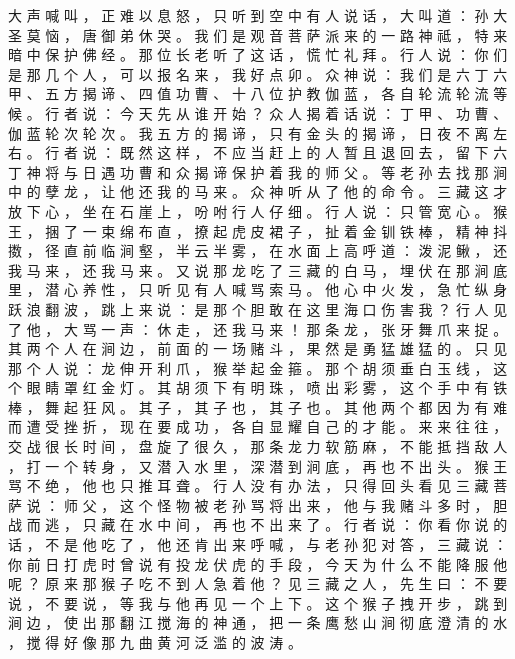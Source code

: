 {大 声 喊 叫 ， 正 难 以 息 怒 ， 只 听 到 空 中 有 人 说 话 ， 大 叫 道 ： 孙 大 圣 莫 恼 ， 唐 御 弟 休 哭 。
我 们 是 观 音 菩 萨 派 来 的 一 路 神 祗 ， 特 来 暗 中 保 护 佛 经 。
那 位 长 老 听 了 这 话 ， 慌 忙 礼 拜 。
行 人 说 ： 你 们 是 那 几 个 人 ， 可 以 报 名 来 ， 我 好 点 卯 。
众 神 说 ： 我 们 是 六 丁 六 甲 、 五 方 揭 谛 、 四 值 功 曹 、 十 八 位 护 教 伽 蓝 ， 各 自 轮 流 轮 流 等 候 。
行 者 说 ： 今 天 先 从 谁 开 始 ？ 众 人 揭 着 话 说 ： 丁 甲 、 功 曹 、 伽 蓝 轮 次 轮 次 。
我 五 方 的 揭 谛 ， 只 有 金 头 的 揭 谛 ， 日 夜 不 离 左 右 。
行 者 说 ： 既 然 这 样 ， 不 应 当 赶 上 的 人 暂 且 退 回 去 ， 留 下 六 丁 神 将 与 日 遇 功 曹 和 众 揭 谛 保 护 着 我 的 师 父 。
等 老 孙 去 找 那 涧 中 的 孽 龙 ， 让 他 还 我 的 马 来 。
众 神 听 从 了 他 的 命 令 。
三 藏 这 才 放 下 心 ， 坐 在 石 崖 上 ， 吩 咐 行 人 仔 细 。
行 人 说 ： 只 管 宽 心 。
猴 王 ， 捆 了 一 束 绵 布 直 ， 撩 起 虎 皮 裙 子 ， 扯 着 金 钏 铁 棒 ， 精 神 抖 擞 ， 径 直 前 临 涧 壑 ， 半 云 半 雾 ， 在 水 面 上 高 呼 道 ： 泼 泥 鳅 ， 还 我 马 来 ， 还 我 马 来 。 又 说 那 龙 吃 了 三 藏 的 白 马 ， 埋 伏 在 那 涧 底 里 ， 潜 心 养 性 ， 只 听 见 有 人 喊 骂 索 马 。
他 心 中 火 发 ， 急 忙 纵 身 跃 浪 翻 波 ， 跳 上 来 说 ： 是 那 个 胆 敢 在 这 里 海 口 伤 害 我 ？ 行 人 见 了 他 ， 大 骂 一 声 ： 休 走 ， 还 我 马 来 ！
那 条 龙 ， 张 牙 舞 爪 来 捉 。
其 两 个 人 在 涧 边 ， 前 面 的 一 场 赌 斗 ， 果 然 是 勇 猛 雄 猛 的 。
只 见 那 个 人 说 ： 龙 伸 开 利 爪 ， 猴 举 起 金 箍 。
那 个 胡 须 垂 白 玉 线 ， 这 个 眼 睛 罩 红 金 灯 。
其 胡 须 下 有 明 珠 ， 喷 出 彩 雾 ， 这 个 手 中 有 铁 棒 ， 舞 起 狂 风 。
其 子 ， 其 子 也 ， 其 子 也 。
其 他 两 个 都 因 为 有 难 而 遭 受 挫 折 ， 现 在 要 成 功 ， 各 自 显 耀 自 己 的 才 能 。
来 来 往 往 ， 交 战 很 长 时 间 ， 盘 旋 了 很 久 ， 那 条 龙 力 软 筋 麻 ， 不 能 抵 挡 敌 人 ， 打 一 个 转 身 ， 又 潜 入 水 里 ， 深 潜 到 涧 底 ， 再 也 不 出 头 。
猴 王 骂 不 绝 ， 他 也 只 推 耳 聋 。
行 人 没 有 办 法 ， 只 得 回 头 看 见 三 藏 菩 萨 说 ： 师 父 ， 这 个 怪 物 被 老 孙 骂 将 出 来 ， 他 与 我 赌 斗 多 时 ， 胆 战 而 逃 ， 只 藏 在 水 中 间 ， 再 也 不 出 来 了 。
行 者 说 ： 你 看 你 说 的 话 ， 不 是 他 吃 了 ， 他 还 肯 出 来 呼 喊 ， 与 老 孙 犯 对 答 ， 三 藏 说 ： 你 前 日 打 虎 时 曾 说 有 投 龙 伏 虎 的 手 段 ， 今 天 为 什 么 不 能 降 服 他 呢 ？ 原 来 那 猴 子 吃 不 到 人 急 着 他 ？
见 三 藏 之 人 ， 先 生 曰 ： 不 要 说 ， 不 要 说 ， 等 我 与 他 再 见 一 个 上 下 。
这 个 猴 子 拽 开 步 ， 跳 到 涧 边 ， 使 出 那 翻 江 搅 海 的 神 通 ， 把 一 条 鹰 愁 山 涧 彻 底 澄 清 的 水 ， 搅 得 好 像 那 九 曲 黄 河 泛 滥 的 波 涛 。
}
